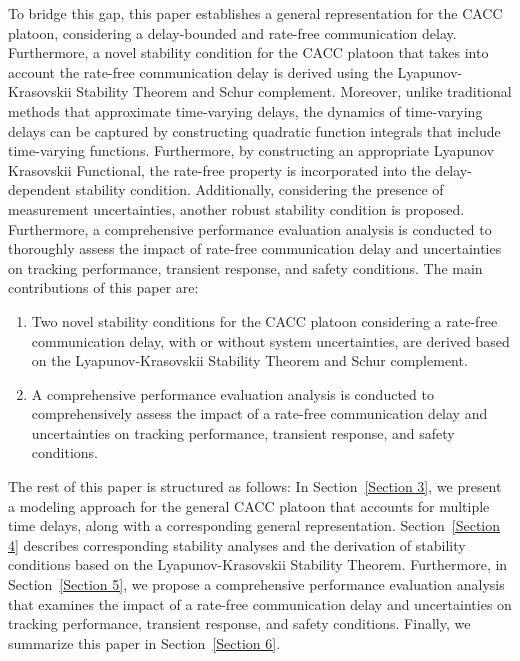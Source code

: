 \documentclass[a4paper]{cas-sc}
\begin{document}
To bridge this gap, this paper establishes a general representation for the CACC platoon, considering a delay-bounded and rate-free communication delay. Furthermore, a novel stability condition for the CACC platoon that takes into account the rate-free communication delay is derived using the Lyapunov-Krasovskii Stability Theorem and Schur complement. Moreover, unlike traditional methods that approximate time-varying delays, the dynamics of time-varying delays can be captured by constructing quadratic function integrals that include time-varying functions. Furthermore, by constructing an appropriate Lyapunov Krasovskii Functional, the rate-free property is incorporated into the delay-dependent stability condition. Additionally, considering the presence of measurement uncertainties, another robust stability condition is proposed. Furthermore, a comprehensive performance evaluation analysis is conducted to thoroughly assess the impact of rate-free communication delay and uncertainties on tracking performance, transient response, and safety conditions. 
The main contributions of this paper are:
\begin{enumerate}
  \item Two novel stability conditions for the CACC platoon considering a rate-free communication delay, with or without system uncertainties, are derived based on the Lyapunov-Krasovskii Stability Theorem and Schur complement.
  \item A comprehensive performance evaluation analysis is conducted to comprehensively assess the impact of a rate-free communication delay and uncertainties on tracking performance, transient response, and safety conditions.
\end{enumerate}

The rest of this paper is structured as follows: In Section~\ref{Section 3}, we present a modeling approach for the general CACC platoon that accounts for multiple time delays, along with a corresponding general representation. Section~\ref{Section 4} describes corresponding stability analyses and the derivation of stability conditions based on the Lyapunov-Krasovskii Stability Theorem. Furthermore, in Section~\ref{Section 5}, we propose a comprehensive performance evaluation analysis that examines the impact of a rate-free communication delay and uncertainties on tracking performance, transient response, and safety conditions. Finally, we summarize this paper in Section~\ref{Section 6}.
\end{document}
